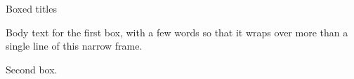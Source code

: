 \documentclass[11pt]{beamer}
\begin{document}
\begin{frame}[t]{Boxed titles}
\begin{tcolorbox}[posterbox,title=Problem]
Body text for the first box, with a few words so that it wraps over more than a single line of this narrow frame.
\end{tcolorbox}
\begin{tcolorbox}[posterbox,title=Other,colframe=red!70!black,colbacktitle=red!70!black]
Second box.
\end{tcolorbox}
\end{frame}
\end{document}
